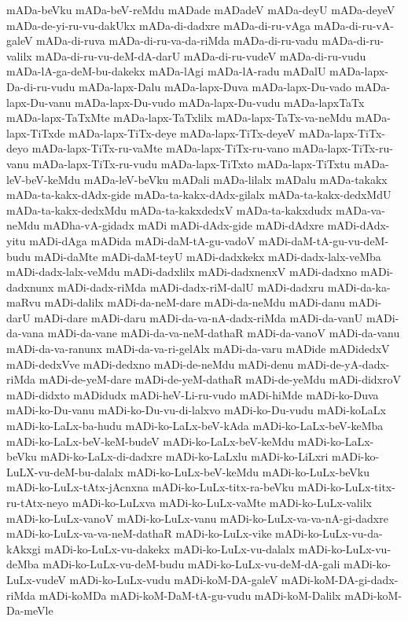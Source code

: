 {mADa-beVku
mADa-beV-reMdu
mADade
mADadeV
mADa-deyU
mADa-deyeV
mADa-de-yi-ru-vu-dakUkx
mADa-di-dadxre
mADa-di-ru-vAga
mADa-di-ru-vA-galeV
mADa-di-ruva
mADa-di-ru-va-da-riMda
mADa-di-ru-vadu
mADa-di-ru-valilx
mADa-di-ru-vu-deM-dA-darU
mADa-di-ru-vudeV
mADa-di-ru-vudu
mADa-lA-ga-deM-bu-dakekx
mADa-lAgi
mADa-lA-radu
mADalU
mADa-lapx-Da-di-ru-vudu
mADa-lapx-Dalu
mADa-lapx-Duva
mADa-lapx-Du-vado
mADa-lapx-Du-vanu
mADa-lapx-Du-vudo
mADa-lapx-Du-vudu
mADa-lapxTaTx
mADa-lapx-TaTxMte
mADa-lapx-TaTxlilx
mADa-lapx-TaTx-va-neMdu
mADa-lapx-TiTxde
mADa-lapx-TiTx-deye
mADa-lapx-TiTx-deyeV
mADa-lapx-TiTx-deyo
mADa-lapx-TiTx-ru-vaMte
mADa-lapx-TiTx-ru-vano
mADa-lapx-TiTx-ru-vanu
mADa-lapx-TiTx-ru-vudu
mADa-lapx-TiTxto
mADa-lapx-TiTxtu
mADa-leV-beV-keMdu
mADa-leV-beVku
mADali
mADa-lilalx
mADalu
mADa-takakx
mADa-ta-kakx-dAdx-gide
mADa-ta-kakx-dAdx-gilalx
mADa-ta-kakx-dedxMdU
mADa-ta-kakx-dedxMdu
mADa-ta-kakxdedxV
mADa-ta-kakxdudx
mADa-va-neMdu
mADha-vA-gidadx
mADi
mADi-dAdx-gide
mADi-dAdxre
mADi-dAdx-yitu
mADi-dAga
mADida
mADi-daM-tA-gu-vadoV
mADi-daM-tA-gu-vu-deM-budu
mADi-daMte
mADi-daM-teyU
mADi-dadxkekx
mADi-dadx-lalx-veMba
mADi-dadx-lalx-veMdu
mADi-dadxlilx
mADi-dadxnenxV
mADi-dadxno
mADi-dadxnunx
mADi-dadx-riMda
mADi-dadx-riM-dalU
mADi-dadxru
mADi-da-ka-maRvu
mADi-dalilx
mADi-da-neM-dare
mADi-da-neMdu
mADi-danu
mADi-darU
mADi-dare
mADi-daru
mADi-da-va-nA-dadx-riMda
mADi-da-vanU
mADi-da-vana
mADi-da-vane
mADi-da-va-neM-dathaR
mADi-da-vanoV
mADi-da-vanu
mADi-da-va-ranunx
mADi-da-va-ri-gelAlx
mADi-da-varu
mADide
mADidedxV
mADi-dedxVve
mADi-dedxno
mADi-de-neMdu
mADi-denu
mADi-de-yA-dadx-riMda
mADi-de-yeM-dare
mADi-de-yeM-dathaR
mADi-de-yeMdu
mADi-didxroV
mADi-didxto
mADidudx
mADi-heV-Li-ru-vudo
mADi-hiMde
mADi-ko-Duva
mADi-ko-Du-vanu
mADi-ko-Du-vu-di-lalxvo
mADi-ko-Du-vudu
mADi-koLaLx
mADi-ko-LaLx-ba-hudu
mADi-ko-LaLx-beV-kAda
mADi-ko-LaLx-beV-keMba
mADi-ko-LaLx-beV-keM-budeV
mADi-ko-LaLx-beV-keMdu
mADi-ko-LaLx-beVku
mADi-ko-LaLx-di-dadxre
mADi-ko-LaLxlu
mADi-ko-LiLxri
mADi-ko-LuLX-vu-deM-bu-dalalx
mADi-ko-LuLx-beV-keMdu
mADi-ko-LuLx-beVku
mADi-ko-LuLx-tAtx-jAcnxna
mADi-ko-LuLx-titx-ra-beVku
mADi-ko-LuLx-titx-ru-tAtx-neyo
mADi-ko-LuLxva
mADi-ko-LuLx-vaMte
mADi-ko-LuLx-valilx
mADi-ko-LuLx-vanoV
mADi-ko-LuLx-vanu
mADi-ko-LuLx-va-va-nA-gi-dadxre
mADi-ko-LuLx-va-va-neM-dathaR
mADi-ko-LuLx-vike
mADi-ko-LuLx-vu-da-kAkxgi
mADi-ko-LuLx-vu-dakekx
mADi-ko-LuLx-vu-dalalx
mADi-ko-LuLx-vu-deMba
mADi-ko-LuLx-vu-deM-budu
mADi-ko-LuLx-vu-deM-dA-gali
mADi-ko-LuLx-vudeV
mADi-ko-LuLx-vudu
mADi-koM-DA-galeV
mADi-koM-DA-gi-dadx-riMda
mADi-koMDa
mADi-koM-DaM-tA-gu-vudu
mADi-koM-Dalilx
mADi-koM-Da-meVle
}
